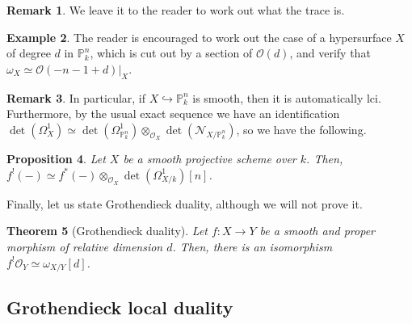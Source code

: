 \documentclass[10pt]{article}
\newtheorem{thm}{Theorem}[section]
\newtheorem{prop}[thm]{Proposition}
\theoremstyle{definition}
\newtheorem{exmp}[thm]{Example}
\newtheorem{defn}[thm]{Definition}
\newtheorem{rmk}[thm]{Remark}
\DeclareMathOperator{\Spec}{Spec}
\newcommand{\PP}{\mathbb{P}}
\newcommand{\OO}{\mathcal{O}}
\newcommand{\todo}[1]{\textbf{\textcolor{red}{TODO #1}}}
\begin{document}
\begin{rmk}
We leave it to the reader to work out what the trace is.
\end{rmk}

\begin{exmp}
The reader is encouraged to work out the case of a hypersurface  $X$ of degree $d$ in $\PP^n_k$, which is cut out by a section of $\OO(d)$, and verify that $\omega_X \simeq \OO(-n-1+d)|_X$.
\end{exmp}

\begin{rmk}
In particular, if $X \hookrightarrow \PP^n_k$ is smooth, then it is automatically lci.  Furthermore, by the usual exact sequence we have an identification $\det(\Omega^1_X) \simeq \det(\Omega^1_{\PP^n_k}) \otimes_{\OO_X} \det(\mathcal{N}_{X/\PP^n_k})$, so we have the following.
\end{rmk}

\begin{prop}
Let $X$ be a smooth projective scheme over $k$.  Then, $f^!(-) \simeq f^*(-) \otimes_{\OO_X} \det(\Omega^1_{X/k})[n]$.
\end{prop}


Finally, let us state Grothendieck duality, although we will not prove it.
\begin{thm}[Grothendieck duality]
Let $f: X \rightarrow Y$ be a smooth and proper morphism of relative dimension $d$.  Then, there is an isomorphism $f^! \OO_Y \simeq \omega_{X/Y}[d]$.
\end{thm}


%
%

\subsection{Grothendieck local duality}
\end{document}
